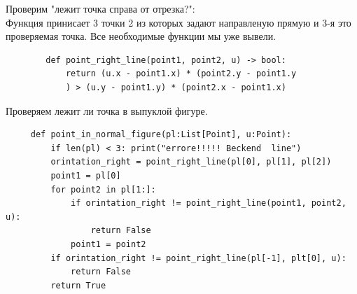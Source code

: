 \documentclass[12pt]{article} %
\begin{document}
 	 \hspace*{1cm}Проверим "лежит точка справа от отрезка?": \\
 	 Функция принисает 3 точки 2 из которых задают направленую прямую и 3-я это проверяемая точка. Все необходимые функции мы уже вывели.
 	 \begin{verbatim}
 	 	def point_right_line(point1, point2, u) -> bool:
 	 	    return (u.x - point1.x) * (point2.y - point1.y
 	 	    ) > (u.y - point1.y) * (point2.x - point1.x)
 	 \end{verbatim}
 	 \hspace*{1cm}Проверяем лежит ли точка в выпуклой фигуре. 
 	 \begin{verbatim}
 	 def point_in_normal_figure(pl:List[Point], u:Point):
 	     if len(pl) < 3: print("errore!!!!! Beckend  line")
 	     orintation_right = point_right_line(pl[0], pl[1], pl[2])
 	     point1 = pl[0]
 	     for point2 in pl[1:]:
 	         if orintation_right != point_right_line(point1, point2, u):
 	             return False
 	         point1 = point2
 	     if orintation_right != point_right_line(pl[-1], plt[0], u):
 	         return False
 	     return True
 	 
 	
 	 \end{verbatim}
 	 
\end{document}
